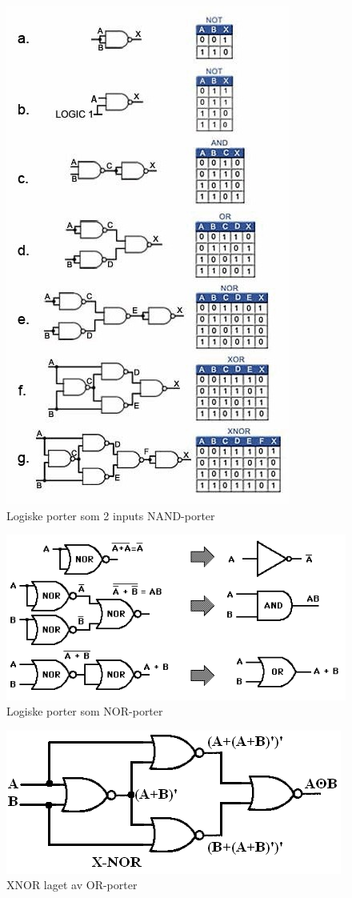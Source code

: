 \documentclass{article}
\begin{document}
	\begin{figure}[H]
		\includegraphics{NAND.jpg}
		\caption{Logiske porter som 2 inputs NAND-porter}
	\end{figure}
	
		
	\begin{figure}[H]
		\includegraphics[scale=0.6]{nor.png}
		\caption{Logiske porter som NOR-porter}
	\end{figure}
	
	\begin{figure}[H]
		\includegraphics[scale=0.6]{NasX.PNG}
		\caption{XNOR laget av OR-porter}
	\end{figure}
	
\end{document}
